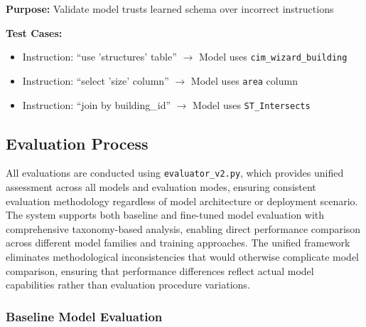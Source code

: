 \textbf{Purpose:} Validate model trusts learned schema over incorrect instructions

\textbf{Test Cases:}
\begin{itemize}[leftmargin=1.2em]
  \item Instruction: ``use 'structures' table'' $\rightarrow$ Model uses \texttt{cim\_wizard\_building}
  \item Instruction: ``select 'size' column'' $\rightarrow$ Model uses \texttt{area} column
  \item Instruction: ``join by building\_id'' $\rightarrow$ Model uses \texttt{ST\_Intersects}
\end{itemize}




\subsection{Evaluation Process}

All evaluations are conducted using \texttt{evaluator\_v2.py}, which provides unified assessment across all models and evaluation modes, ensuring consistent evaluation methodology regardless of model architecture or deployment scenario. The system supports both baseline and fine-tuned model evaluation with comprehensive taxonomy-based analysis, enabling direct performance comparison across different model families and training approaches. The unified framework eliminates methodological inconsistencies that would otherwise complicate model comparison, ensuring that performance differences reflect actual model capabilities rather than evaluation procedure variations.

\subsubsection{Baseline Model Evaluation}

